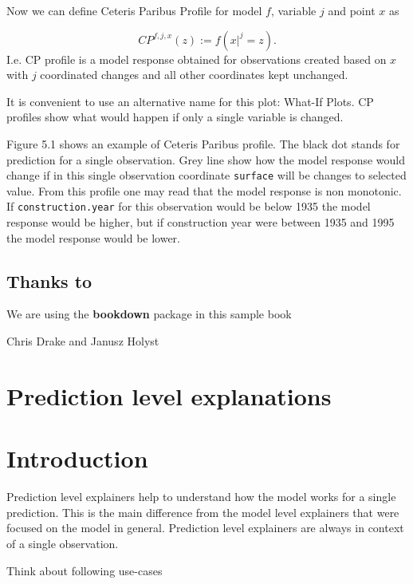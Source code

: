 \documentclass[]{book}
\theoremstyle{definition}
\theoremstyle{definition}
\theoremstyle{definition}
\theoremstyle{remark}
\begin{document}
Now we can define Ceteris Paribus Profile for model \(f\), variable
\(j\) and point \(x\) as

\[
CP^{f, j, x}(z) := f(x|^j = z).
\] I.e. CP profile is a model response obtained for observations created
based on \(x\) with \(j\) coordinated changes and all other coordinates
kept unchanged.

It is convenient to use an alternative name for this plot: What-If
Plots. CP profiles show what would happen if only a single variable is
changed.

Figure 5.1 shows an example of Ceteris Paribus profile. The black dot
stands for prediction for a single observation. Grey line show how the
model response would change if in this single observation coordinate
\texttt{surface} will be changes to selected value. From this profile
one may read that the model response is non monotonic. If
\texttt{construction.year} for this observation would be below 1935 the
model response would be higher, but if construction year were between
1935 and 1995 the model response would be lower.

\hypertarget{thanksto}{%
\section{Thanks to}\label{thanksto}}

We are using the \textbf{bookdown} package \citep{R-bookdown} in this
sample book

Chris Drake and Janusz Holyst

\hypertarget{prediction-level-explanations}{%
\chapter*{Prediction level
explanations}\label{prediction-level-explanations}}

\hypertarget{PredictionExplainers}{%
\chapter{Introduction}\label{PredictionExplainers}}

Prediction level explainers help to understand how the model works for a
single prediction. This is the main difference from the model level
explainers that were focused on the model in general. Prediction level
explainers are always in context of a single observation.

Think about following use-cases
\end{document}
